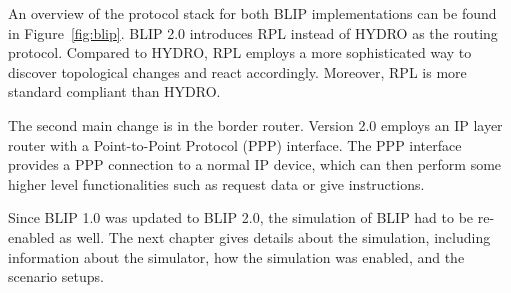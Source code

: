 An overview of the protocol stack for both BLIP implementations can be found in Figure~\ref{fig:blip}. BLIP 2.0 introduces RPL instead of HYDRO as the routing protocol. Compared to HYDRO, RPL employs a more sophisticated way to discover topological changes and react accordingly. Moreover, RPL is more standard compliant than HYDRO.

The second main change is in the border router. Version 2.0 employs an IP layer router with a Point-to-Point Protocol (PPP) interface. The PPP interface provides a PPP connection to a normal IP device, which can then perform some higher level functionalities such as request data or give instructions.

Since BLIP 1.0 was updated to BLIP 2.0, the simulation of BLIP had to be re-enabled as well. The next chapter gives details about the simulation, including information about the simulator, how the simulation was enabled, and the scenario setups.

